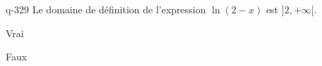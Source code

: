 \begin{truefalse}{q-329}
Le domaine de définition de l'expression $\ln(2-x)$ est $]2,+\infty[$.
\item Vrai
\item* Faux
\end{truefalse}

